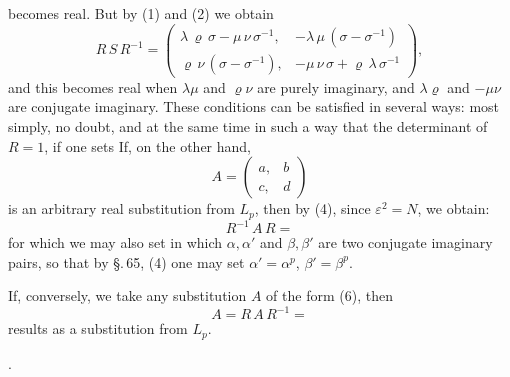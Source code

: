 becomes real. But by (1) and (2) we obtain
\[
R\,S\,R^{-1} = \begin{pmatrix} \lambda\,\varrho\,\sigma - \mu\,\nu\,\sigma^{-1}, & -\lambda\,\mu\,(\sigma-\sigma^{-1}) \\ \varrho\,\nu\,(\sigma-\sigma^{-1}), & -\mu\,\nu\,\sigma+\varrho\,\lambda\,\sigma^{-1} \end{pmatrix},
\]
and this becomes real when $\lambda\mu$ and $\varrho\nu$ are purely imaginary, and $\lambda\varrho$ and
$-\mu\nu$ are conjugate imaginary. These conditions can be satisfied
in several ways: most simply, no doubt, and at the same time
in such a way that the determinant of $R = 1$, if one sets
If, on the other hand,
\[
A = \begin{pmatrix} a, & b \\ c, & d \end{pmatrix}
\]
is an arbitrary real substitution from $L_p$, then by (4),
since $\varepsilon^2 = N$, we obtain:
\[
R^{-1}\,A\,R =
\]
for which we may also set
in which $\alpha,\alpha'$ and $\beta,\beta'$ are two conjugate imaginary pairs,
so that by §.\,65, (4) one may set $\alpha' = \alpha^p$, $\beta' = \beta^p$.

If, conversely, we take any substitution $A$ of the
form (6), then
\[
A = R\,A\,R^{-1} =
\]
results as a  substitution from $L_p$.

.
